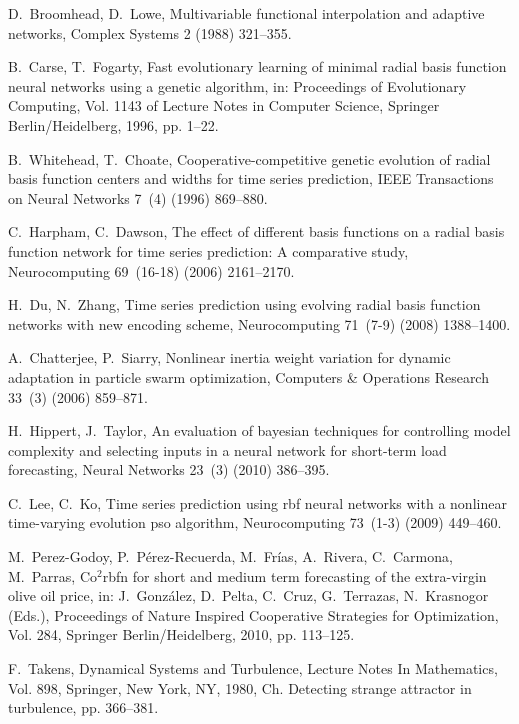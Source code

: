\documentclass[runningheads]{llncs}
\begin{document}
\begin{thebibliography}{x}
D.~Broomhead, D.~Lowe, Multivariable functional interpolation and adaptive
  networks, Complex Systems 2 (1988) 321--355.

B.~Carse, T.~Fogarty, Fast evolutionary learning of minimal radial basis
  function neural networks using a genetic algorithm, in: Proceedings of
  Evolutionary Computing, Vol. 1143 of Lecture Notes in Computer Science,
  Springer Berlin/Heidelberg, 1996, pp. 1--22.

B.~Whitehead, T.~Choate, Cooperative-competitive genetic evolution of radial
  basis function centers and widths for time series prediction, IEEE
  Transactions on Neural Networks 7~(4) (1996) 869--880.

C.~Harpham, C.~Dawson, The effect of different basis functions on a radial
  basis function network for time series prediction: A comparative study,
  Neurocomputing 69~(16-18) (2006) 2161--2170.

H.~Du, N.~Zhang, Time series prediction using evolving radial basis function
  networks with new encoding scheme, Neurocomputing 71~(7-9) (2008) 1388--1400.

A.~Chatterjee, P.~Siarry, Nonlinear inertia weight variation for dynamic
  adaptation in particle swarm optimization, Computers \& Operations Research
  33~(3) (2006) 859--871.

H.~Hippert, J.~Taylor, An evaluation of bayesian techniques for controlling
  model complexity and selecting inputs in a neural network for short-term load
  forecasting, Neural Networks 23~(3) (2010) 386--395.

C.~Lee, C.~Ko, Time series prediction using rbf neural networks with a
  nonlinear time-varying evolution pso algorithm, Neurocomputing 73~(1-3)
  (2009) 449--460.

M.~Perez-Godoy, P.~P\'erez-Recuerda, M.~Fr\'{i}as, A.~Rivera, C.~Carmona,
  M.~Parras, Co$^2$rbfn for short and medium term forecasting of the
  extra-virgin olive oil price, in: J.~Gonz\'alez, D.~Pelta, C.~Cruz,
  G.~Terrazas, N.~Krasnogor (Eds.), Proceedings of Nature Inspired Cooperative
  Strategies for Optimization, Vol. 284, Springer Berlin/Heidelberg, 2010, pp.
  113--125.

F.~Takens, Dynamical Systems and Turbulence, Lecture Notes In Mathematics, Vol.
  898, Springer, New York, NY, 1980, Ch. Detecting strange attractor in
  turbulence, pp. 366--381.


\end{thebibliography}
\end{document}
